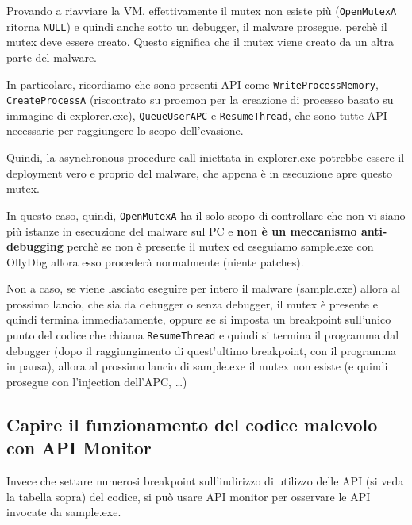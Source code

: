 \documentclass[
    a4paper, %
    11pt %
]{article}
\begin{document}
            Provando a riavviare la VM, effettivamente il mutex non esiste più (\texttt{OpenMutexA} ritorna \texttt{NULL}) e quindi anche sotto
            un debugger, il malware prosegue, perchè il mutex deve essere creato. Questo significa che 
            il mutex viene creato da un altra parte del malware. 
            
            In particolare, ricordiamo che sono presenti API come \texttt{WriteProcessMemory}, 
            \texttt{CreateProcessA} (riscontrato su procmon per la creazione di processo basato su 
            immagine di explorer.exe), \texttt{QueueUserAPC} e \texttt{ResumeThread}, che sono tutte API 
            necessarie per raggiungere lo scopo dell'evasione. 
            
            Quindi, la asynchronous procedure call iniettata in explorer.exe potrebbe essere il deployment 
            vero e proprio del malware, che appena è in esecuzione apre questo mutex.
            
            In questo caso, quindi, \texttt{OpenMutexA} ha il solo scopo di controllare che non vi siano 
            più istanze in esecuzione del malware sul PC e \textbf{non è un meccanismo anti-debugging}
            perchè se non è presente il mutex ed eseguiamo sample.exe con OllyDbg allora esso procederà
            normalmente (niente patches).

            Non a caso, se viene lasciato eseguire per intero il malware (sample.exe) allora al prossimo
            lancio, che sia da debugger o senza debugger, il mutex è presente e quindi termina 
            immediatamente, oppure se si imposta un breakpoint sull'unico punto del codice che chiama
            \texttt{ResumeThread} e quindi si termina il programma dal debugger (dopo il raggiungimento di quest'ultimo breakpoint, con il programma in pausa), allora al prossimo lancio
            di sample.exe il mutex non esiste (e quindi prosegue con l'injection dell'APC, \dots)

            \subsection{Capire il funzionamento del codice malevolo con API Monitor}\label{sect:malcodeapimon}

            Invece che settare numerosi breakpoint sull'indirizzo di utilizzo delle API (si veda la 
            tabella sopra) del codice, si può usare API monitor per osservare le API invocate da 
            sample.exe.
\end{document}
